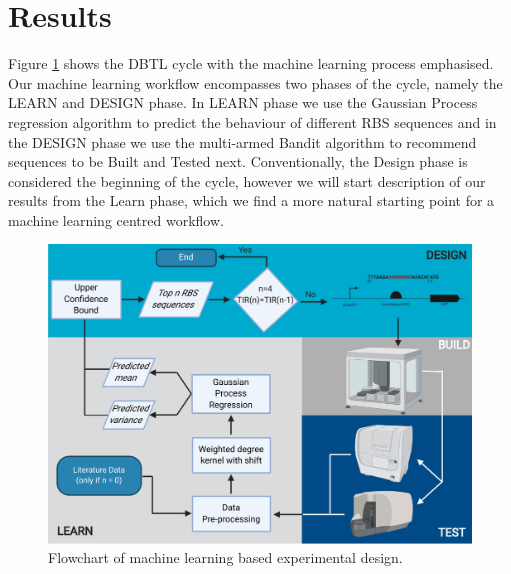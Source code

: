 \documentclass{article}
\begin{document}


\section{Results}

Figure \ref{fig: Flowchart} shows the DBTL cycle with the machine learning process emphasised. Our machine learning workflow encompasses two phases of the cycle, namely the LEARN and DESIGN phase. 
In LEARN phase we use the Gaussian Process regression algorithm to predict the behaviour of different RBS sequences and in the DESIGN phase we use the multi-armed Bandit algorithm to recommend sequences to be Built and Tested next. 
Conventionally, the Design phase is considered the beginning of the cycle, however we will start description of our results from the Learn phase, which we find a more natural starting point for a machine learning centred workflow.\\

\begin{figure}[h]
    \centering
    \includegraphics[scale=0.7]{plots/flowchart.pdf}
    \caption{Flowchart of machine learning based experimental design.}
    \label{fig: Flowchart}
\end{figure}
\end{document}
